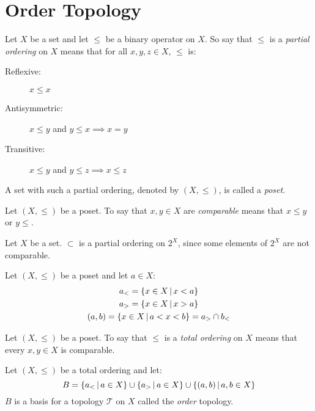 \documentclass[letterpaper,12pt,fleqn]{article}
\newcommand{\T}{\mathscr{T}}
\begin{document}
\section*{Order Topology}

\begin{definition}
  Let \(X\) be a set and let \(\le\) be a binary operator on \(X\).  So say that \(\le\) is a \emph{partial ordering}
  on \(X\) means that for all \(x,y,z\in X\), \(\le\) is:
  \begin{description}
  \item[Reflexive:] \(x\le x\)
  \item[Antisymmetric:] \(x\le y\) and \(y\le x\implies x=y\)
  \item[Transitive:] \(x\le y\) and \(y\le z\implies x\le z\)
  \end{description}
  A set with such a partial ordering, denoted by \((X,\le)\), is called a \emph{poset}.
\end{definition}

\begin{definition}[Comparable]
  Let \((X,\le)\) be a poset.  To say that \(x,y\in X\) are \emph{comparable} means that \(x\le y\) or \(y\le \).
\end{definition}

\begin{example}[Subset]
  Let \(X\) be a set.  \(\subset\) is a partial ordering on \(2^X\), since some elements of \(2^X\) are not
  comparable.
\end{example}

\begin{notation}
  Let \((X,\le)\) be a poset and let \(a\in X\):
  \begin{gather*}
    a_{<}=\left\{{x\in X}\,\middle|\,{x<a}\right\} \\
    a_{>}=\left\{{x\in X}\,\middle|\,{x>a}\right\} \\
    (a,b)=\left\{{x\in X}\,\middle|\,{a<x<b}\right\}=a_{>}\cap b_{<}
  \end{gather*}
\end{notation}

\begin{definition}
  Let \((X,\le)\) be a poset.  To say that \(\le\) is a \emph{total ordering} on \(X\) means that every
  \(x,y\in X\) is comparable.
\end{definition}

\begin{definition}
  Let \((X,\le)\) be a total ordering and let:
  \[B=\left\{{a_{<}}\,\middle|\,{a\in X}\right\}\cup\left\{{a_{>}}\,\middle|\,{a\in X}\right\}\cup\left\{{(a,b)}\,\middle|\,{a,b\in X}\right\}\]
  \(B\) is a basis for a topology \(\T\) on \(X\) called the \emph{order} topology.
\end{definition}
\end{document}
